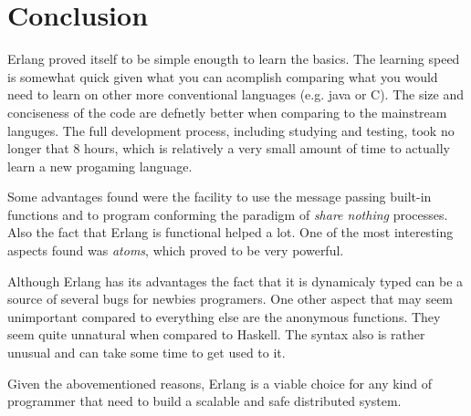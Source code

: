 \documentclass[twocolumn,10pt]{article}
\begin{document}
\section{Conclusion}
Erlang proved itself to be simple enougth to learn the basics. The learning speed is somewhat quick given what you can acomplish comparing what you would need to learn on other more conventional languages (e.g. java or C). The size and conciseness of the code are defnetly better when comparing to the mainstream languges. The full development process, including studying and testing, took no longer that 8 hours, which is relatively a very small amount of time to actually learn a new progaming language.

Some advantages found were the facility to use the message passing built-in functions and to program conforming the paradigm of \textit{share nothing} processes. Also the fact that Erlang is functional helped a lot. One of the most interesting aspects found was \textit{atoms}, which proved to be very powerful.

Although Erlang has its advantages the fact that it is dynamicaly typed can be a source of several bugs for newbies programers. One other aspect that may seem unimportant compared to everything else are the anonymous functions. They seem quite unnatural when compared to Haskell. The syntax also is rather unusual and can take some time to get used to it.

Given the abovementioned reasons, Erlang is a viable choice for any kind of programmer that need to build a scalable and safe distributed system.
\end{document}
